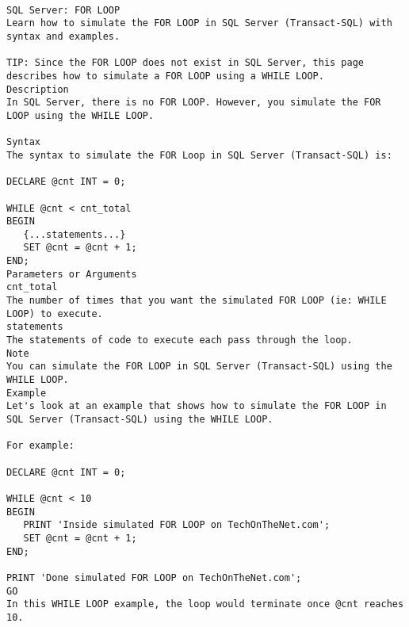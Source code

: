\begin{lstlisting}[frame=single]

SQL Server: FOR LOOP
Learn how to simulate the FOR LOOP in SQL Server (Transact-SQL) with syntax and examples.

TIP: Since the FOR LOOP does not exist in SQL Server, this page describes how to simulate a FOR LOOP using a WHILE LOOP.
Description
In SQL Server, there is no FOR LOOP. However, you simulate the FOR LOOP using the WHILE LOOP.

Syntax
The syntax to simulate the FOR Loop in SQL Server (Transact-SQL) is:

DECLARE @cnt INT = 0;

WHILE @cnt < cnt_total
BEGIN
   {...statements...}
   SET @cnt = @cnt + 1;
END;
Parameters or Arguments
cnt_total
The number of times that you want the simulated FOR LOOP (ie: WHILE LOOP) to execute.
statements
The statements of code to execute each pass through the loop.
Note
You can simulate the FOR LOOP in SQL Server (Transact-SQL) using the WHILE LOOP.
Example
Let's look at an example that shows how to simulate the FOR LOOP in SQL Server (Transact-SQL) using the WHILE LOOP.

For example:

DECLARE @cnt INT = 0;

WHILE @cnt < 10
BEGIN
   PRINT 'Inside simulated FOR LOOP on TechOnTheNet.com';
   SET @cnt = @cnt + 1;
END;

PRINT 'Done simulated FOR LOOP on TechOnTheNet.com';
GO
In this WHILE LOOP example, the loop would terminate once @cnt reaches 10.


\end{lstlisting}    